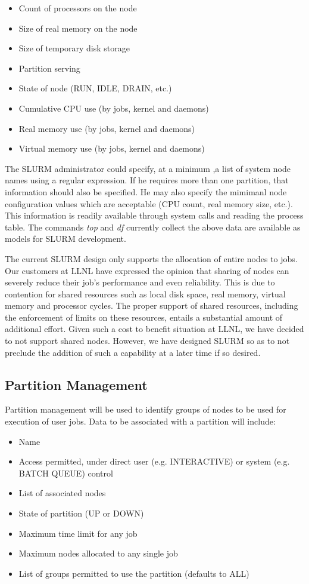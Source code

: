 \begin{itemize}
\item Count of processors on the node
\item Size of real memory on the node
\item Size of temporary disk storage
\item Partition serving
\item State of node (RUN, IDLE, DRAIN, etc.)
\item Cumulative CPU use (by jobs, kernel and daemons)
\item Real memory use (by jobs, kernel and daemons)
\item Virtual memory use (by jobs, kernel and daemons)
\end{itemize}

The SLURM administrator could specify, at a minimum ,a list of system node 
names using a regular expression. 
If he requires more than one partition, that information should also be specified. 
He may also specify the mimimanl node configuration values which are acceptable 
(CPU count, real memory size, etc.). 
This information is readily available through system calls and reading the
process table. The commands \textit{top} and \textit{df} 
currently collect the above data are available as models for SLURM development. 

The current SLURM design only supports the allocation of entire nodes to 
jobs. Our customers at LLNL have expressed the opinion that sharing of 
nodes can severely reduce their job's performance and even reliability. 
This is due to contention for shared resources such as local disk space, 
real memory, virtual memory and processor cycles. The proper support of 
shared resources, including the enforcement of limits on these resources, 
entails a substantial amount of additional effort. Given such a cost to 
benefit situation at LLNL, we have decided to not support shared nodes. 
However, we have designed SLURM so as to not preclude the addition of 
such a capability at a later time if so desired.

\subsection{Partition Management}

Partition management will be used to identify groups of nodes to be used for
execution of user jobs. Data to be associated with a partition will include:
\begin{itemize}
\item Name
\item Access permitted, under direct user (e.g. INTERACTIVE) or system (e.g. BATCH QUEUE) control
\item List of associated nodes
\item State of partition (UP or DOWN)
\item Maximum time limit for any job
\item Maximum nodes allocated to any single job
\item List of groups permitted to use the partition (defaults to ALL)
\end{itemize}


